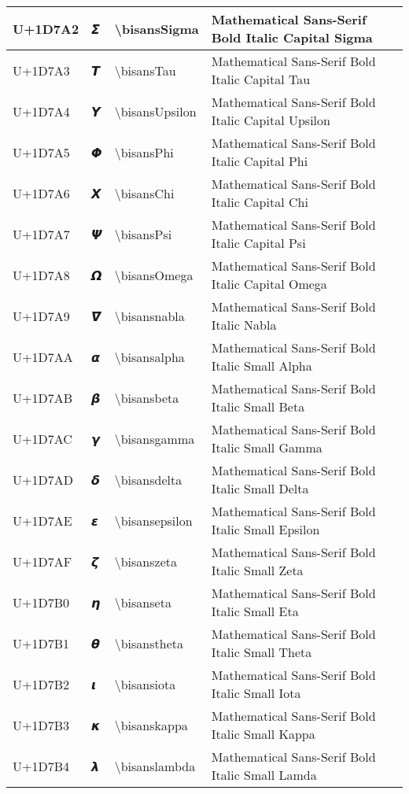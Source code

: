 \begin{table}[h]
\begin{tabulary}{\linewidth}{|L|L|L|L|}
\hline
U+1D7A2 & 𝞢 & {\textbackslash}bisansSigma & Mathematical Sans-Serif Bold Italic Capital Sigma \\
\hline
U+1D7A3 & 𝞣 & {\textbackslash}bisansTau & Mathematical Sans-Serif Bold Italic Capital Tau \\
\hline
U+1D7A4 & 𝞤 & {\textbackslash}bisansUpsilon & Mathematical Sans-Serif Bold Italic Capital Upsilon \\
\hline
U+1D7A5 & 𝞥 & {\textbackslash}bisansPhi & Mathematical Sans-Serif Bold Italic Capital Phi \\
\hline
U+1D7A6 & 𝞦 & {\textbackslash}bisansChi & Mathematical Sans-Serif Bold Italic Capital Chi \\
\hline
U+1D7A7 & 𝞧 & {\textbackslash}bisansPsi & Mathematical Sans-Serif Bold Italic Capital Psi \\
\hline
U+1D7A8 & 𝞨 & {\textbackslash}bisansOmega & Mathematical Sans-Serif Bold Italic Capital Omega \\
\hline
U+1D7A9 & 𝞩 & {\textbackslash}bisansnabla & Mathematical Sans-Serif Bold Italic Nabla \\
\hline
U+1D7AA & 𝞪 & {\textbackslash}bisansalpha & Mathematical Sans-Serif Bold Italic Small Alpha \\
\hline
U+1D7AB & 𝞫 & {\textbackslash}bisansbeta & Mathematical Sans-Serif Bold Italic Small Beta \\
\hline
U+1D7AC & 𝞬 & {\textbackslash}bisansgamma & Mathematical Sans-Serif Bold Italic Small Gamma \\
\hline
U+1D7AD & 𝞭 & {\textbackslash}bisansdelta & Mathematical Sans-Serif Bold Italic Small Delta \\
\hline
U+1D7AE & 𝞮 & {\textbackslash}bisansepsilon & Mathematical Sans-Serif Bold Italic Small Epsilon \\
\hline
U+1D7AF & 𝞯 & {\textbackslash}bisanszeta & Mathematical Sans-Serif Bold Italic Small Zeta \\
\hline
U+1D7B0 & 𝞰 & {\textbackslash}bisanseta & Mathematical Sans-Serif Bold Italic Small Eta \\
\hline
U+1D7B1 & 𝞱 & {\textbackslash}bisanstheta & Mathematical Sans-Serif Bold Italic Small Theta \\
\hline
U+1D7B2 & 𝞲 & {\textbackslash}bisansiota & Mathematical Sans-Serif Bold Italic Small Iota \\
\hline
U+1D7B3 & 𝞳 & {\textbackslash}bisanskappa & Mathematical Sans-Serif Bold Italic Small Kappa \\
\hline
U+1D7B4 & 𝞴 & {\textbackslash}bisanslambda & Mathematical Sans-Serif Bold Italic Small Lamda \\

\end{tabulary}
\end{table}
